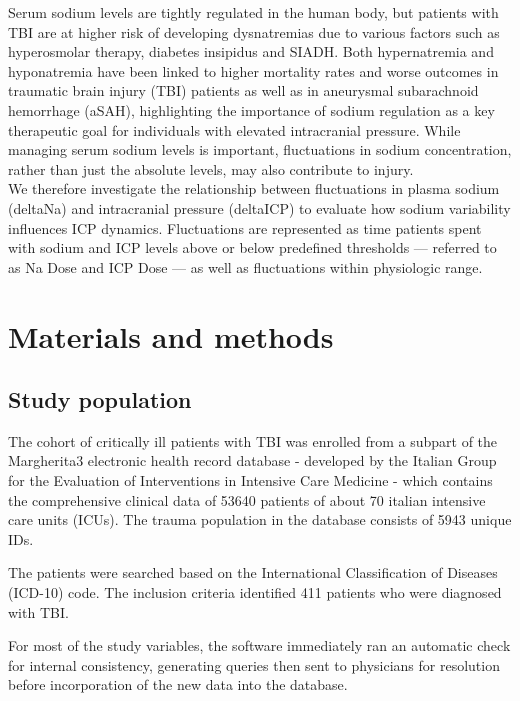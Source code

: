 Serum sodium levels are tightly regulated in the human body, but patients with TBI are at higher risk of developing dysnatremias due to various factors such as hyperosmolar therapy, diabetes insipidus and SIADH. Both hypernatremia\cite{maggioreRelationIncidenceHypernatremia2009a}\cite{vedantamMorbidityMortalityAssociated2017a} and hyponatremia \cite{yumotoPrevalenceRiskFactors2015a} have been linked to higher mortality rates and worse outcomes in traumatic brain injury (TBI) patients as well as in aneurysmal subarachnoid hemorrhage (aSAH)\cite{labibSodiumItsImpact2024}\cite{balesEffectHyponatremiaSodium2016}, highlighting the importance of sodium regulation as a key therapeutic goal for individuals with elevated intracranial pressure. While managing serum sodium levels is important, fluctuations in sodium concentration, rather than just the absolute levels, may also  contribute to injury.\\

We therefore investigate the relationship between fluctuations in plasma sodium (deltaNa) and intracranial pressure (deltaICP) to evaluate how sodium variability influences ICP dynamics. Fluctuations are represented as time patients spent with sodium and ICP levels above or below predefined thresholds — referred to as Na Dose and ICP Dose — as well as  fluctuations within physiologic range.\\

\section {Materials and methods}
\subsection{Study population}
The cohort of critically ill patients with TBI was enrolled from a subpart of the Margherita3 electronic health record database - developed by the Italian Group for the Evaluation of Interventions in Intensive Care Medicine\cite{finazziDataCollectionResearch2018} - which contains the comprehensive clinical data of 53640 patients of about 70 italian intensive care units (ICUs). The trauma population in the database consists of 5943 unique IDs. 

The patients were searched based on the International Classification of Diseases (ICD-10) code. The inclusion criteria identified 411  patients who were diagnosed with TBI.

For most of the study variables, the software immediately ran an automatic check for internal consistency, generating queries then sent to physicians for resolution before incorporation of the new data into the database.\\

